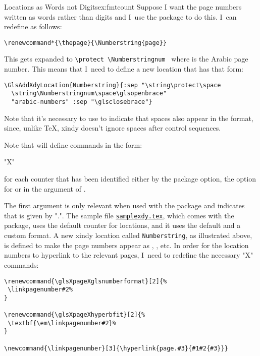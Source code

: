 \documentclass[report,inlinetitle]{nlctdoc}
\newcounter{sample}
\newcommand*{\samplefile}[2][sample]{%
  \hyperref[ex:#1#2]{\texttt{#1#2.tex}}}
\begin{document}
\begin{example}{Locations as Words not Digits}{ex:fmtcount}
Suppose I want the page numbers written as words
rather than digits and I~use the  package to
do this. I~can redefine  as follows:
\begin{verbatim}
\renewcommand*{\thepage}{\Numberstring{page}}
\end{verbatim}
This gets expanded to \verb|\protect \Numberstringnum |
where  is the Arabic page number. This means that I~need to
define a new location that has that form:
\begin{verbatim}
\GlsAddXdyLocation{Numberstring}{:sep "\string\protect\space
  \string\Numberstringnum\space\glsopenbrace"
  "arabic-numbers" :sep "\glsclosebrace"}
\end{verbatim}
Note that it's necessary to use  to indicate that 
spaces also appear in the format, since, unlike \TeX,
\gls{xindy} doesn't ignore spaces after control sequences.

Note that  will define 
commands in the form:
\begin{definition}
"X"
\end{definition}
for each counter that has been identified either by the
 package option, the  option for
 or in the argument of .

The first argument  is only relevant when used with
the  package and indicates that 
is given by ".". The sample
file \samplefile{xdy}, which comes with the 
package, uses the default  counter for locations, and it
uses the default  and a custom 
format. A new \gls{xindy} location called \texttt{Numberstring}, as
illustrated above, is defined to make the page numbers appear as
, , etc. In order for the location numbers to
hyperlink to the relevant pages, I~need to redefine the necessary
"X" commands:
\begin{verbatim}
\renewcommand{\glsXpageXglsnumberformat}[2]{%
 \linkpagenumber#2%
}

\renewcommand{\glsXpageXhyperbfit}[2]{%
 \textbf{\em\linkpagenumber#2}%
}

\newcommand{\linkpagenumber}[3]{\hyperlink{page.#3}{#1#2{#3}}}
\end{verbatim}
\end{example}
\end{document}

